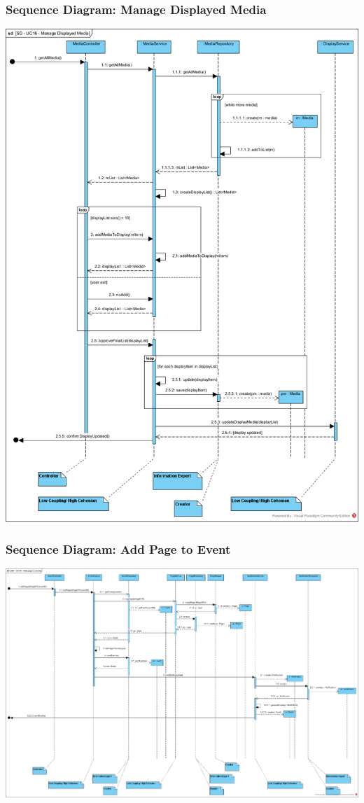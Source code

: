 \subsubsection{Sequence Diagram: Manage Displayed Media}
        \includegraphics[scale=0.55]{images/SD-UC16-ManageDisplayedMedia.png}
        \label{fig:SD-ManageDisplayedMedia}
\subsubsection{Sequence Diagram: Add Page to Event}
        \includegraphics[scale=0.35]{images/SD-UC18-AddPageToEvent.png}
        \label{fig:SD-AddPageToEvent}